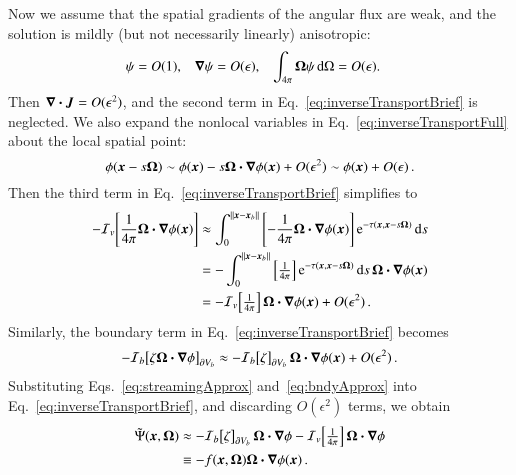 \documentclass{anstrans}
\begin{document}
Now we assume that the spatial gradients of the angular flux
are weak, and the solution is mildly (but not necessarily linearly) anisotropic:
\begin{align} \label{eq:ansatz}
  \psi &= O(1), &
  \bm{\nabla} \psi &= O(\epsilon), &
  \int_{4\pi} \bm{\Omega} \psi\mathop{}\!\mathrm{d}\Omega &= O(\epsilon).
\end{align}
Then $\bm{\nabla} \bm{\cdot}\bm{J}=O(\epsilon^2)$, and the second term in
Eq.~\eqref{eq:inverseTransportBrief} is neglected.
We also expand the nonlocal variables in Eq.~\eqref{eq:inverseTransportFull}
about the local spatial point:
\begin{equation} \label{eq:taylorPhi}
  \phi(\bm{x} - s \bm{\Omega})
  \sim \phi(\bm{x}) - s \bm{\Omega} \bm{\cdot} \bm{\nabla} \phi (\bm{x}) + O(\epsilon^2)
  \sim \phi(\bm{x}) + O(\epsilon) \,.
\end{equation}
Then the third term in Eq.~\eqref{eq:inverseTransportBrief} simplifies to
\begin{align}\nonumber
- \mathcal{I}_{v}\!\left[\frac{1}{4\pi} \bm{\Omega}\bm{\cdot} \bm{\nabla} \phi(\bm{x})\right]
  &\approx \int_{0}^{\left\| \bm{x} - \bm{x}_b \right\|}
    \left[ -\frac1{4\pi}\bm{\Omega}\bm{\cdot} \bm{\nabla} \phi(\bm{x}) \right]
    \mathop{}\!\mathrm{e}^{ -\tau(\bm{x}, \bm{x} - s \bm{\Omega})}
    \mathop{}\!\mathrm{d} s
  \\\nonumber
  &= - \int_{0}^{\left\| \bm{x} - \bm{x}_b \right\|}
    \left[ \tfrac1{4\pi}\right]
    \mathop{}\!\mathrm{e}^{ -\tau(\bm{x}, \bm{x} - s \bm{\Omega})} \mathop{}\!\mathrm{d} s \,
    \bm{\Omega}\bm{\cdot} \bm{\nabla} \phi(\bm{x})
  \\\label{eq:streamingApprox}
  &= - \mathcal{I}_{v}\!\left[ \tfrac1{4\pi} \right] \bm{\Omega}\bm{\cdot} \bm{\nabla} \phi(\bm{x}) +
  O(\epsilon^2) \,.
\end{align}
Similarly, the boundary term in Eq.~\eqref{eq:inverseTransportBrief} becomes
\begin{equation} \label{eq:bndyApprox}
-\mathcal{I}_{b}\!\left[\zeta \bm{\Omega}\bm{\cdot} \bm{\nabla} \phi\right]_{\partial V_b}
\approx -\mathcal{I}_{b}\!\left[\zeta\right]_{\partial V_b} \bm{\Omega}\bm{\cdot} \bm{\nabla} \phi(\bm{x})
+ O(\epsilon^2) \,.
\end{equation}
Substituting Eqs.~\eqref{eq:streamingApprox} and~\eqref{eq:bndyApprox} into
Eq.~\eqref{eq:inverseTransportBrief}, and discarding $O(\epsilon^2)$ terms, we
obtain
\begin{align} \label{eq:approxPsi2}
  \tilde\Psi(\vec{x}, \vec{\Omega}) 
  &\approx 
- \lopinv{b}{\zeta}_{\partial V_b} \vec{\Omega}\vd \grad \phi
- \lopinv{v}{\tfrac{1}{4\pi}}  \vec{\Omega}\vd \grad \phi
\nonumber \\ %
   &\equiv - f(\vec{x}, \vec{\Omega})
\vec{\Omega}\vd \grad \phi(\vec{x})\,.
\end{align}
\end{document}
